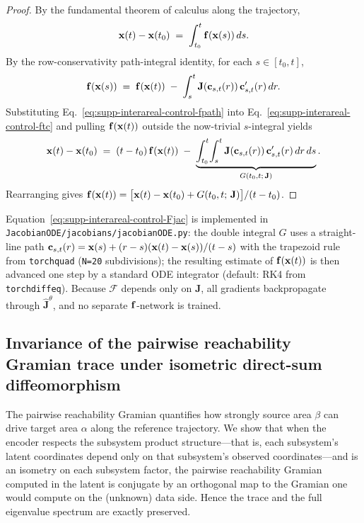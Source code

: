 \begin{proof}
By the fundamental theorem of calculus along the trajectory,
\begin{equation}
\vb{x}(t)-\vb{x}(t_0) \;=\; \int_{t_0}^{t} \vb{f}(\vb{x}(s))\,ds. \label{eq:supp-interareal-control-ftc}
\end{equation}
By the row-conservativity path-integral identity, for each $s\in[t_0,t]$,
\begin{equation}
\vb{f}(\vb{x}(s)) \;=\; \vb{f}(\vb{x}(t)) \;-\; \int_{s}^{t} \mathbf{J}(\vb{c}_{s,t}(r))\,\vb{c}_{s,t}'(r)\,dr. \label{eq:supp-interareal-control-fpath}
\end{equation}
Substituting Eq.~\ref{eq:supp-interareal-control-fpath} into Eq.~\ref{eq:supp-interareal-control-ftc} and pulling $\vb{f}(\vb{x}(t))$ outside the now-trivial $s$-integral yields
\begin{equation}
\vb{x}(t)-\vb{x}(t_0) \;=\; (t-t_0)\,\vb{f}(\vb{x}(t)) \;-\; \underbrace{\int_{t_0}^{t}\!\int_{s}^{t} \mathbf{J}(\vb{c}_{s,t}(r))\,\vb{c}_{s,t}'(r)\,dr\,ds}_{G(t_0,t;\,\mathbf{J})}.
\end{equation}
Rearranging gives $\vb{f}(\vb{x}(t)) = \big[\vb{x}(t)-\vb{x}(t_0)+G(t_0,t;\,\mathbf{J})\big]/(t-t_0)$. \end{proof}

\begin{remark}
Equation~\ref{eq:supp-interareal-control-Fjac} is implemented in \texttt{JacobianODE/jacobians/jacobianODE.py}: the double integral $G$ uses a straight-line path $\vb{c}_{s,t}(r)=\vb{x}(s)+(r-s)(\vb{x}(t)-\vb{x}(s))/(t-s)$ with the trapezoid rule from \texttt{torchquad} (\texttt{N=20} subdivisions); the resulting estimate of $\vb{f}(\vb{x}(t))$ is then advanced one step by a standard ODE integrator (default: RK4 from \texttt{torchdiffeq}). Because $\mathcal{F}$ depends only on $\mathbf{J}$, all gradients backpropagate through $\hat{\mathbf{J}}^\theta$, and no separate $\vb{f}$-network is trained.
\end{remark}

\subsection{Invariance of the pairwise reachability Gramian trace under isometric direct-sum diffeomorphism}\label{supp:interareal-control-proof-gram-inv}

The pairwise reachability Gramian quantifies how strongly source area $\beta$ can drive target area $\alpha$ along the reference trajectory. We show that when the encoder respects the subsystem product structure---that is, each subsystem's latent coordinates depend only on that subsystem's observed coordinates---and is an isometry on each subsystem factor, the pairwise reachability Gramian computed in the latent is conjugate by an orthogonal map to the Gramian one would compute on the (unknown) data side. Hence the trace and the full eigenvalue spectrum are exactly preserved.

